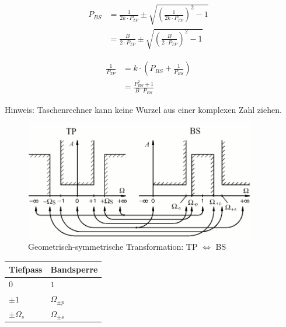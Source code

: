 \documentclass[a4paper, 12pt]{report}
\begin{document}
	\begin{minipage}[t]{0.5\textwidth}
		\vspace{-0.5cm}
		\begin{align*}
			P_{BS} &= \frac{1}{2k \cdot P_{TP}} \pm \sqrt{\left( \frac{1}{2k \cdot P_{TP}} \right)^2 - 1} &\\
			&= \frac{B}{2 \cdot P_{TP}} \pm \sqrt{\left( \frac{B}{2 \cdot P_{TP}} \right)^2 - 1} &
		\end{align*}
	\end{minipage}
	\begin{minipage}[t]{0.5\textwidth}
		\vspace{-0.5cm}
		\begin{align*}
			\frac{1}{P_{TP}} &= k \cdot \left(P_{BS} + \frac{1}{P_{BS}}\right) &\\
			&= \frac{P^2_{BS} + 1}{B \cdot P_{BS}} &
		\end{align*}
	\end{minipage}
	
	\vspace{0.4cm}
	
	Hinweis: Taschenrechner kann keine Wurzel aus einer komplexen Zahl ziehen.
	
	\begin{figure}[H]
		\centering \includegraphics[width=0.9\textwidth]{images/tiefpass-bandsperre-transformation.png}
		\caption{Geometrisch-symmetrische Transformation: TP $ \Leftrightarrow $ BS}
	\end{figure}
	
	\begin{center}
		\begin{tabular}{|C{3cm}|C{3cm}|}
		\hline \textbf{Tiefpass} & \textbf{Bandsperre} \\ 
		\hline $ 0 $ & $ 1 $ \\ 
		\hline $ \pm 1 $ & $ \Omega_{\pm p} $ \\ 
		\hline $ \pm \Omega_s $ & $ \Omega_{\pm s} $ \\ 
		\hline 
		\end{tabular} 
	\end{center}
	
\end{document}
